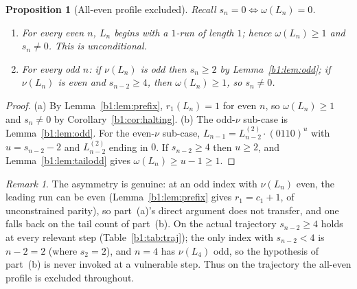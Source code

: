 \documentclass[a4paper]{article}
\theoremstyle{plain}
\newtheorem{proposition}{Proposition}[subsection]
\theoremstyle{definition}
\theoremstyle{remark}
\newtheorem{remark}{Remark}[subsection]
\begin{document}
\begin{proposition}[All-even profile excluded]\label{b1:prop:alleven}
Recall $s_n=0\iff\omega(L_n)=0$.
\begin{enumerate}[label=(\alph*)]
\item For every even $n$, $L_n$ begins with a $1$-run of length $1$; hence $\omega(L_n)\ge 1$ and $s_n\ne 0$. This is unconditional.
\item For every odd $n$: if $\nu(L_n)$ is odd then $s_n\ge 2$ by Lemma~\ref{b1:lem:odd}; if $\nu(L_n)$ is even and $s_{n-2}\ge 4$, then $\omega(L_n)\ge 1$, so $s_n\ne 0$.
\end{enumerate}
\end{proposition}
\begin{proof}
(a) By Lemma~\ref{b1:lem:prefix}, $r_1(L_n)=1$ for even $n$, so $\omega(L_n)\ge 1$ and $s_n\ne 0$ by Corollary~\ref{b1:cor:halting}. (b) The odd-$\nu$ sub-case is Lemma~\ref{b1:lem:odd}. For the even-$\nu$ sub-case, $L_{n-1}=L^{(2)}_{n-2}\cdot(0110)^u$ with $u=s_{n-2}-2$ and $L^{(2)}_{n-2}$ ending in $0$. If $s_{n-2}\ge 4$ then $u\ge 2$, and Lemma~\ref{b1:lem:tailodd} gives $\omega(L_n)\ge u-1\ge 1$.
\end{proof}

\begin{remark}\label{b1:rem:rem17}
The asymmetry is genuine: at an odd index with $\nu(L_n)$ even, the leading run can be even (Lemma~\ref{b1:lem:prefix} gives $r_1=c_1+1$, of unconstrained parity), so part~(a)'s direct argument does not transfer, and one falls back on the tail count of part~(b). On the actual trajectory $s_{n-2}\ge 4$ holds at every relevant step (Table~\ref{b1:tab:traj}); the only index with $s_{n-2}<4$ is $n-2=2$ (where $s_2=2$), and $n=4$ has $\nu(L_4)$ odd, so the hypothesis of part~(b) is never invoked at a vulnerable step. Thus on the trajectory the all-even profile is excluded throughout.
\end{remark}
\end{document}
